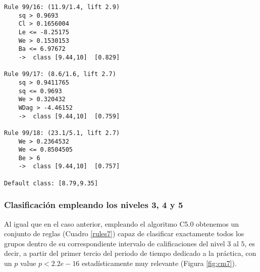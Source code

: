\begin{tcolorbox}[title=Reglas de clasificación para identificar intervalos de notas.]
\begin{multicols}{3}
\begin{verbatim}
Rule 99/16: (11.9/1.4, lift 2.9)
	sq > 0.9693
	Cl > 0.1656004
	Le <= -8.25175
	We > 0.1530153
	Ba <= 6.97672
	->  class [9.44,10]  [0.829]

Rule 99/17: (8.6/1.6, lift 2.7)
	sq > 0.9411765
	sq <= 0.9693
	We > 0.320432
	WDag > -4.46152
	->  class [9.44,10]  [0.759]

Rule 99/18: (23.1/5.1, lift 2.7)
	We > 0.2364532
	We <= 0.8504505
	Be > 6
	->  class [9.44,10]  [0.757]
	
Default class: [8.79,9.35]
    \end{verbatim}
  \end{multicols}
\label{rules8}
\end{tcolorbox}

\subsubsection{Clasificación empleando los niveles 3, 4 y 5}

Al igual que en el caso anterior, empleando el algoritmo C5.0 obtenemos un conjunto de reglas (Cuadro \ref{rules7}) capaz de clasificar exactamente todos los grupos dentro de su correspondiente intervalo de calificaciones del nivel $3$ al $5$, es decir, a partir del primer tercio del periodo de tiempo dedicado a la práctica, con un $p$ value $p < 2.2e-16$ estadísticamente muy relevante (Figura \ref{fig:cm7}).


